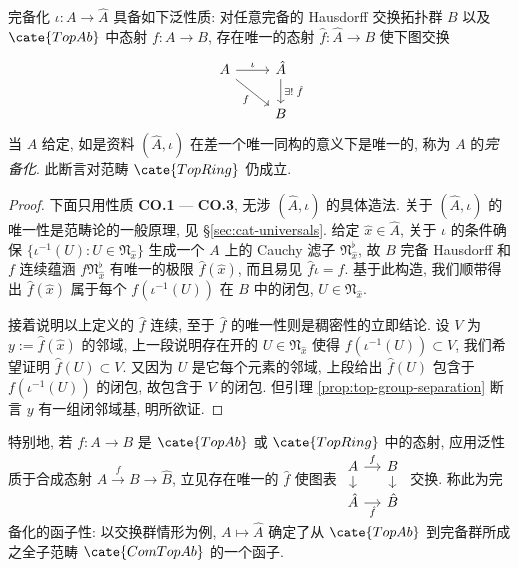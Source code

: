 \begin{proposition}\label{prop:completion-ring-characterization}
	完备化 $\iota: A \to \hat{A}$ 具备如下泛性质: 对任意完备的 Hausdorff 交换拓扑群 $B$ 以及 $\cate{TopAb}$ 中态射 $f: A \to B$, 存在唯一的态射 $\hat{f}: \hat{A} \to B$ 使下图交换
	\[\begin{tikzcd}
	A \arrow[r, "\iota"] \arrow[rd, "f"'] & \hat{A} \arrow[d, "\exists! \;\hat{f}"] \\
	& B
	\end{tikzcd}\]
	当 $A$ 给定, 如是资料 $(\hat{A}, \iota)$ 在差一个唯一同构的意义下是唯一的, 称为 $A$ 的\emph{完备化}. 此断言对范畴 $\cate{TopRing}$ 仍成立.
\end{proposition}
\begin{proof}
	下面只用性质 \textbf{CO.1} --- \textbf{CO.3}, 无涉 $(\hat{A}, \iota)$ 的具体造法. 关于 $(\hat{A}, \iota)$ 的唯一性是范畴论的一般原理, 见 \S\ref{sec:cat-universals}. 给定 $\hat{x} \in \hat{A}$, 关于 $\iota$ 的条件确保 $\{\iota^{-1}(U): U \in \mathfrak{N}_{\hat{x}} \}$ 生成一个 $A$ 上的 Cauchy 滤子 $\mathfrak{N}^\flat_{\hat{x}}$, 故 $B$ 完备 Hausdorff 和 $f$ 连续蕴涵 $f\mathfrak{N}^\flat_{\hat{x}}$ 有唯一的极限 $\hat{f}(\hat{x})$, 而且易见 $\hat{f}\iota = f$. 基于此构造, 我们顺带得出 $\hat{f}(\hat{x})$ 属于每个 $f(\iota^{-1}(U))$ 在 $B$ 中的闭包, $U \in \mathfrak{N}_{\hat{x}}$.

	接着说明以上定义的 $\hat{f}$ 连续, 至于 $\hat{f}$ 的唯一性则是稠密性的立即结论. 设 $V$ 为 $y := \hat{f}(\hat{x})$ 的邻域, 上一段说明存在开的 $U \in \mathfrak{N}_{\hat{x}}$ 使得 $f(\iota^{-1}(U)) \subset V$, 我们希望证明 $\hat{f}(U) \subset V$. 又因为 $U$ 是它每个元素的邻域, 上段给出 $\hat{f}(U)$ 包含于 $f(\iota^{-1}(U))$ 的闭包, 故包含于 $V$ 的闭包.	但引理 \ref{prop:top-group-separation} 断言 $y$ 有一组闭邻域基, 明所欲证.
\end{proof}
特别地, 若 $f: A \to B$ 是 $\cate{TopAb}$ 或 $\cate{TopRing}$ 中的态射, 应用泛性质于合成态射 $A \xrightarrow{f} B \to \hat{B}$, 立见存在唯一的 $\hat{f}$ 使图表
$\begin{tikzcd}[row sep=small, column sep=small]
	A \arrow[r, "f"] \arrow[d] & B \arrow[d] \\
	\hat{A} \arrow[r, "\hat{f}"'] & \hat{B}
\end{tikzcd}$
交换. 称此为完备化的函子性: 以交换群情形为例, $A \mapsto \hat{A}$ 确定了从 $\cate{TopAb}$ 到完备群所成之全子范畴 $\cate{ComTopAb}$ 的一个函子.

